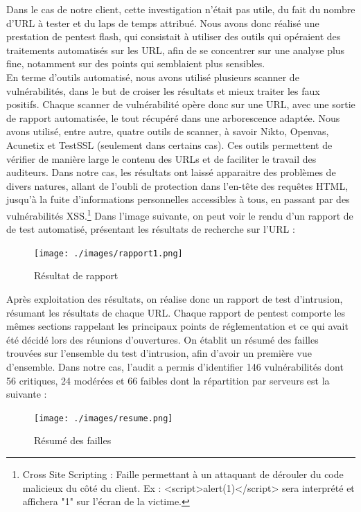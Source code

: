 \documentclass[a4paper]{memoir}
\begin{document}
Dans le cas de notre client, cette investigation n'était pas utile, du fait du nombre d'URL à tester et du laps de temps attribué. Nous avons donc réalisé une prestation de pentest flash, qui consistait à utiliser des outils qui opéraient des traitements automatisés sur les URL, afin de se concentrer sur une analyse plus fine, notamment sur des points qui semblaient plus sensibles.\\
En terme d'outils automatisé, nous avons utilisé plusieurs scanner de vulnérabilités, dans le but de croiser les résultats et mieux traiter les faux positifs. Chaque scanner de vulnérabilité opère donc sur une URL, avec une sortie de rapport automatisée, le tout récupéré dans une arborescence adaptée. Nous avons utilisé, entre autre, quatre outils de scanner, à savoir Nikto, Openvas, Acunetix et TestSSL (seulement dans certains cas). Ces outils permettent de vérifier de manière large le contenu des URLs et de faciliter le travail des auditeurs.
Dans notre cas, les résultats ont laissé apparaitre des problèmes de divers natures, allant de l'oubli de protection dans l'en-tête des requêtes HTML, jusqu'à la fuite d'informations personnelles accessibles à tous, en passant par des vulnérabilités XSS.\footnote{Cross Site Scripting : Faille permettant à un attaquant de dérouler du code malicieux du côté du client. Ex : <script>alert(1)</script> sera interprété et affichera "1" sur l'écran de la victime.}
Dans l'image suivante, on peut voir le rendu d'un rapport de de test automatisé, présentant les résultats de recherche sur l'URL :

\begin{figure}[!ht]
\center
\texttt{[image: ./images/rapport1.png]}
\caption{Résultat de rapport}
\label{ID}
\end{figure}

Après exploitation des résultats, on réalise donc un rapport de test d'intrusion, résumant les résultats de chaque URL. Chaque rapport de pentest comporte les mêmes sections rappelant les principaux points de réglementation et ce qui avait été décidé lors des réunions d'ouvertures. 
On établit un résumé des failles trouvées sur l'ensemble du test d'intrusion, afin d'avoir un première vue d'ensemble. Dans notre cas, l’audit a permis d’identifier 146 vulnérabilités dont 56 critiques, 24 modérées et 66 faibles dont la répartition par serveurs est la suivante :

\begin{figure}[!ht]
\center
\texttt{[image: ./images/resume.png]}
\caption{Résumé des failles}
\label{ID}
\end{figure}
\end{document}
